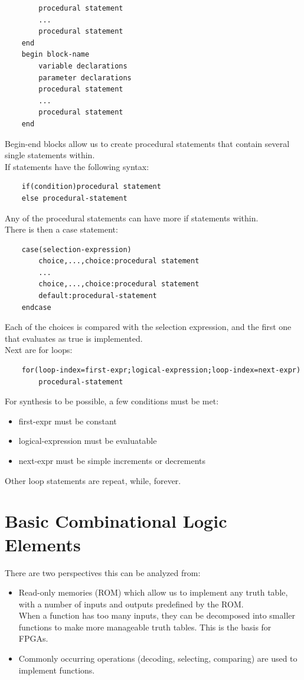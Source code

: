 \documentclass[nobib]{tufte-handout}
\begin{document}
\begin{itemize}
\begin{lstlisting}
        procedural statement
        ...
        procedural statement
    end
    begin block-name
        variable declarations
        parameter declarations
        procedural statement
        ... 
        procedural statement
    end
    \end{lstlisting}
              Begin-end blocks allow us to create procedural statements that contain several
              single statements within.\\ If statements have the following syntax:
              \begin{lstlisting}
    if(condition)procedural statement
    else procedural-statement
    \end{lstlisting}
              Any of the procedural statements can have more if statements within.\\ There is
              then a case statement:
              \begin{lstlisting}
    case(selection-expression)
        choice,...,choice:procedural statement
        ... 
        choice,...,choice:procedural statement
        default:procedural-statement
    endcase
    \end{lstlisting}
              Each of the choices is compared with the selection expression, and the first
              one that evaluates as true is implemented.\\ Next are for loops:
              \begin{lstlisting}
    for(loop-index=first-expr;logical-expression;loop-index=next-expr)
        procedural-statement
    \end{lstlisting}
              For synthesis to be possible, a few conditions must be met:
              \begin{itemize}
                  \item first-expr must be constant
                  \item logical-expression must be evaluatable
                  \item next-expr must be simple increments or decrements
              \end{itemize}
              Other loop statements are repeat, while, forever.
    \end{itemize}
    \section{Basic Combinational Logic Elements}
    There are two perspectives this can be analyzed from:
    \begin{itemize}
        \item Read-only memories (ROM) which allow us to implement any truth table, with a
              number of inputs and outputs predefined by the ROM.\\ When a function has too
              many inputs, they can be decomposed into smaller functions to make more
              manageable truth tables. This is the basis for FPGAs.
        \item Commonly occurring operations (decoding, selecting, comparing) are used to
              implement functions.
    \end{itemize}
\end{document}
